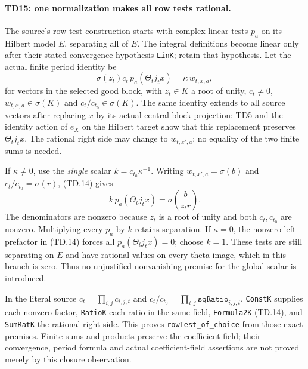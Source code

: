 \paragraph{TD15: one normalization makes all row tests rational.}
The source's row-test construction starts with complex-linear tests
$p_a$ on its Hilbert model $E$, separating all of $E$. The integral
definitions become linear only after their stated convergence
hypothesis \texttt{LinK}; retain that hypothesis. Let the actual finite
period identity be
\[
 \sigma(z_t)c_t\,p_a(\Theta_t j_t x)
       =\kappa\,w_{t,x,a},
 \tag{TD.14}
\]
for vectors in the selected good block, with $z_t\in K$ a root of
unity, $c_t\ne0$, $w_{t,x,a}\in\sigma(K)$ and
$c_t/c_{t_0}\in\sigma(K)$. The same identity extends to all source
vectors after replacing $x$ by its actual central-block projection:
TD5 and the identity action of $e_X$ on the Hilbert target show that
this replacement preserves $\Theta_tj_tx$. The rational right side
may change to $w_{t,x',a}$; no equality of the two finite sums is
needed.

If $\kappa\ne0$, use the \emph{single} scalar
$k=c_{t_0}\kappa^{-1}$. Writing
$w_{t,x',a}=\sigma(b)$ and $c_t/c_{t_0}=\sigma(r)$, (TD.14) gives
\[
 k\,p_a(\Theta_tj_tx)=\sigma\!\left(\frac{b}{z_t r}\right).
 \tag{TD.15}
\]
The denominators are nonzero because $z_t$ is a root of unity and
both $c_t,c_{t_0}$ are nonzero. Multiplying every $p_a$ by $k$ retains
separation. If $\kappa=0$, the nonzero left prefactor in (TD.14) forces
all $p_a(\Theta_tj_tx)=0$; choose $k=1$. These tests are still
separating on $E$ and have rational values on every theta image,
which in this branch is zero. Thus no unjustified nonvanishing premise
for the global scalar is introduced.

In the literal source $c_t=\prod_{i,j}c_{i,j,t}$ and
$c_t/c_{t_0}=\prod_{i,j}\texttt{sqRatio}_{i,j,t}$.
\texttt{ConstK} supplies each nonzero factor, \texttt{RatioK} each
ratio in the same field, \texttt{Formula2K} (TD.14), and
\texttt{SumRatK} the rational right side. This proves
\texttt{rowTest\_of\_choice} from those exact premises. Finite sums
and products preserve the coefficient field; their convergence,
period formula and actual coefficient-field assertions are not proved
merely by this closure observation.


